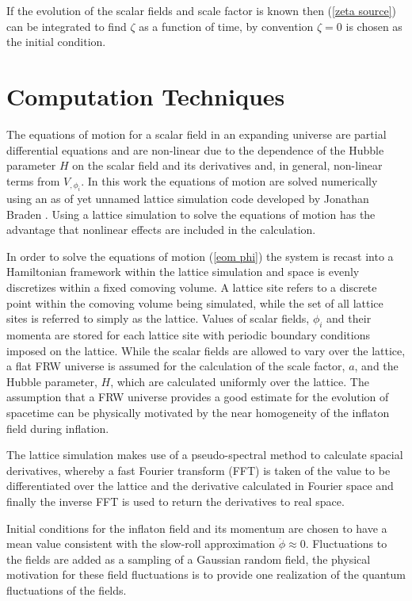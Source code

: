 \documentclass[letterpaper,11pt]{article}
\begin{document}
If the evolution of the scalar fields and scale factor is known then (\ref{zeta source}) can be integrated to find $\zeta$ as a function of time, by convention $\zeta=0$ is chosen as the initial condition.

\section{Computation Techniques} \label{computation}
The equations of motion for a scalar field in an expanding universe are partial differential equations and are non-linear due to the dependence of the Hubble parameter $H$ on the scalar field and its derivatives and, in general, non-linear terms from $V_{,\phi_i}$. In this work the equations of motion are solved numerically using an as of yet unnamed lattice simulation code developed by Jonathan Braden \cite{latcode}. Using a lattice simulation to solve the equations of motion has the advantage that nonlinear effects are included in the calculation.

In order to solve the equations of motion (\ref{eom phi}) the system is recast into a Hamiltonian framework within the lattice simulation and space is evenly discretizes within a fixed comoving volume. A lattice site refers to a discrete point within the comoving volume being simulated, while the set of all lattice sites is referred to simply as the lattice. Values of scalar fields, $\phi_i$ and their momenta are stored for each lattice site with periodic boundary conditions imposed on the lattice. While the scalar fields are allowed to vary over the lattice, a flat FRW universe is assumed for the calculation of the scale factor, $a$, and the Hubble parameter, $H$, which are calculated uniformly over the lattice. The assumption that a FRW universe provides a good estimate for the evolution of spacetime can be physically motivated by the near homogeneity of the inflaton field during inflation.

The lattice simulation makes use of a pseudo-spectral method to calculate spacial derivatives, whereby a fast Fourier transform (FFT) is taken of the value to be differentiated over the lattice and the derivative calculated in Fourier space and finally the inverse FFT is used to return the derivatives to real space.

Initial conditions for the inflaton field and its momentum are chosen to have a mean value consistent with the slow-roll approximation $\ddot{\phi} \approx 0$. Fluctuations to the fields are added as a sampling of a Gaussian random field, the physical motivation for these field fluctuations is to provide one realization of the quantum fluctuations of the fields.
\end{document}
